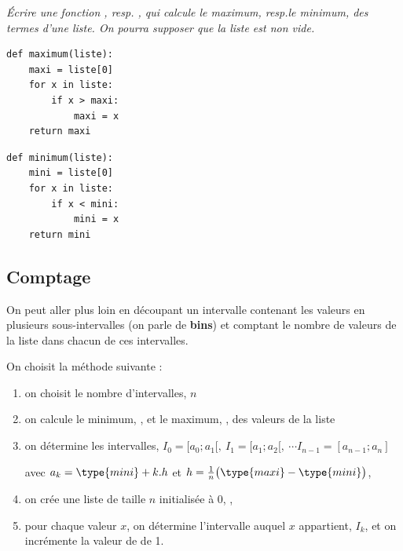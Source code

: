 \begin{Exercise}\it Écrire une fonction , resp. ,  qui calcule le maximum, resp.le minimum, des termes d'une liste. On pourra supposer que la liste est non vide.
\end{Exercise}
\begin{Answer}
\begin{lstlisting}
def maximum(liste):
    maxi = liste[0]
    for x in liste:
        if x > maxi:
            maxi = x
    return maxi
\end{lstlisting}

\begin{lstlisting}
def minimum(liste):
    mini = liste[0]
    for x in liste:
        if x < mini:
            mini = x
    return mini
\end{lstlisting}
\end{Answer}
\subsection{Comptage}
On peut aller plus loin en découpant un intervalle contenant les valeurs en plusieurs sous-intervalles (on parle de {\bf bins}) et comptant le nombre de valeurs de la liste dans chacun de ces intervalles.

On choisit la méthode suivante :
\begin{enumerate}
    \item on choisit le nombre d'intervalles, $n$
    \item on calcule le minimum, , et le maximum, , des valeurs de la liste
    \item on détermine les intervalles, $I_0 = [a_0; a_1[,\ I_1 = [a_1; a_2[,\ \cdots I_{n-1} = [a_{n-1};a_n]$
    
    avec $a_k = \type{mini} + k.h$ et $h = \frac 1n\bigl(\type{maxi}-\type{mini}\bigr)$,
    \item on crée une liste de taille $n$ initialisée à 0, ,
    \item pour chaque valeur $x$, on détermine l'intervalle auquel $x$ appartient, $I_k$, et on incrémente la valeur de  de 1.
\end{enumerate}

